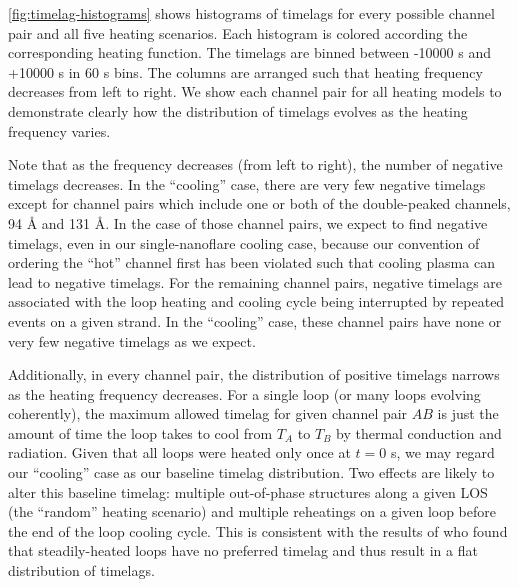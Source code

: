 \autoref{fig:timelag-histograms} shows histograms of timelags for every possible channel pair and all five heating scenarios. Each histogram is colored according the corresponding heating function. The timelags are binned between -10000 s and +10000 s in 60 s bins. The columns are arranged such that heating frequency decreases from left to right. We show each channel pair for all heating models to demonstrate clearly how the distribution of timelags evolves as the heating frequency varies.

Note that as the frequency decreases (from left to right), the number of negative timelags decreases. In the ``cooling'' case, there are very few negative timelags except for channel pairs which include one or both of the double-peaked channels, 94 \AA{} and 131 \AA{}. In the case of those channel pairs, we expect to find negative timelags, even in our single-nanoflare cooling case, because our convention of ordering the ``hot'' channel first has been violated such that cooling plasma can lead to negative timelags. For the remaining channel pairs, negative timelags are associated with the loop heating and cooling cycle being interrupted by repeated events on a given strand. In the ``cooling'' case, these channel pairs have none or very few negative timelags as we expect. 

Additionally, in every channel pair, the distribution of positive timelags narrows as the heating frequency decreases. For a single loop (or many loops evolving coherently), the maximum allowed timelag for given channel pair $AB$ is just the amount of time the loop takes to cool from $T_A$ to $T_B$ by thermal conduction and radiation. Given that all loops were heated only once at $t=0$ s, we may regard our ``cooling'' case as our baseline timelag distribution. Two effects are likely to alter this baseline timelag: multiple out-of-phase structures along a given LOS (the ``random'' heating scenario) and multiple reheatings on a given loop before the end of the loop cooling cycle. This is consistent with the results of \citet{viall_signatures_2016} who found that steadily-heated loops have no preferred timelag and thus result in a flat distribution of timelags. 


